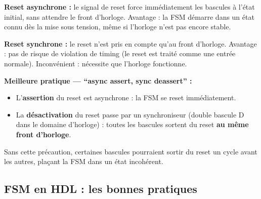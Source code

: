 \documentclass[12pt,a4paper,twoside]{book}
\begin{document}
\begin{formule}
\textbf{Reset asynchrone :} le signal de reset force immédiatement les bascules à l'état initial, sans attendre le front d'horloge. Avantage : la FSM démarre dans un état connu dès la mise sous tension, même si l'horloge n'est pas encore stable.

\textbf{Reset synchrone :} le reset n'est pris en compte qu'au front d'horloge. Avantage : pas de risque de violation de timing (le reset est traité comme une entrée normale). Inconvénient : nécessite que l'horloge fonctionne.

\textbf{Meilleure pratique --- ``async assert, sync deassert'' :}
\begin{itemize}[nosep]
\item L'\textbf{assertion} du reset est asynchrone : la FSM se reset immédiatement.
\item La \textbf{désactivation} du reset passe par un synchroniseur (double bascule D dans le domaine d'horloge) : toutes les bascules sortent du reset \textbf{au même front d'horloge}.
\end{itemize}
Sans cette précaution, certaines bascules pourraient sortir du reset un cycle avant les autres, plaçant la FSM dans un état incohérent.
\end{formule}

\subsection{FSM en HDL : les bonnes pratiques}
\end{document}
